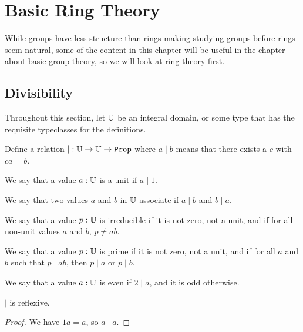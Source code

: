 \documentclass[../../math.tex]{subfiles}
\begin{document}
\setcounter{chapter}{12}

\chapter{Basic Ring Theory}

While groups have less structure than rings making studying groups before rings
seem natural, some of the content in this chapter will be useful in the chapter
about basic group theory, so we will look at ring theory first.

\section{Divisibility}

Throughout this section, let $\mathbb{U}$ be an integral domain, or some type that has
the requisite typeclasses for the definitions.

\begin{definition}
    Define a relation $\mathord{\mid} : \U \to \U \to \Prop$ where $a \mid b$
    means that there exists a $c$ with $ca = b$.
\end{definition}

\begin{definition}
    We say that a value $a : \mathbb{U}$ is a unit if $a \mid 1$.
\end{definition}

\begin{definition}
    We say that two values $a$ and $b$ in $\mathbb{U}$ associate if $a \mid b$ and $b
    \mid a$.
\end{definition}

\begin{definition}
    We say that a value $p : \mathbb{U}$ is irreducible if it is not zero, not a unit,
    and if for all non-unit values $a$ and $b$, $p \neq ab$.
\end{definition}

\begin{definition}
    We say that a value $p : \mathbb{U}$ is prime if it is not zero, not a unit, and if
    for all $a$ and $b$ such that $p \mid ab$, then $p \mid a$ or $p \mid b$.
\end{definition}

\begin{definition}
    We say that a value $a : \mathbb{U}$ is even if $2 \mid a$, and it is odd otherwise.
\end{definition}

\begin{instance}
    $\mid$ is reflexive.
\end{instance}
\begin{proof}
    We have $1a = a$, so $a \mid a$.
\end{proof}
\end{document}
